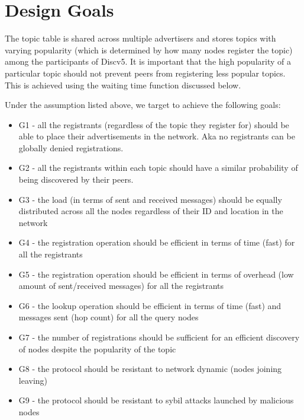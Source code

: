 
\section{Design Goals}\label{sec:goals}

The topic table is shared across multiple advertisers and stores topics with varying popularity (which is determined by how many nodes register the topic) among the participants of Discv5. It is important that the high popularity of a particular topic should not prevent peers from registering less popular topics. This is achieved using the waiting time function discussed below.



Under the assumption listed above, we target to achieve the following goals:
\begin{itemize}
    \item G1 - all the registrants (regardless of the topic they register for) should be able to place their advertisements in the network. Aka no registrants can be globally denied registrations.
    \item G2 - all the registrants within each topic should have a similar probability of being discovered by their peers.
    \item G3 - the load (in terms of sent and received messages) should be equally distributed across all the nodes regardless of their ID and location in the network
    \item G4 - the registration operation should be efficient in terms of time (fast) for all the registrants
    \item G5 - the registration operation should be efficient in terms of overhead (low amount of sent/received messages) for all the registrants
    \item G6 - the lookup operation should be efficient in terms of time (fast) and messages sent (hop count) for all the query nodes
    \item G7 - the number of registrations should be sufficient for an efficient discovery of nodes despite the popularity of the topic
    \item G8 - the protocol should be resistant to network dynamic (nodes joining leaving)
    \item G9 - the protocol should be resistant to sybil attacks launched by malicious nodes
\end{itemize}
